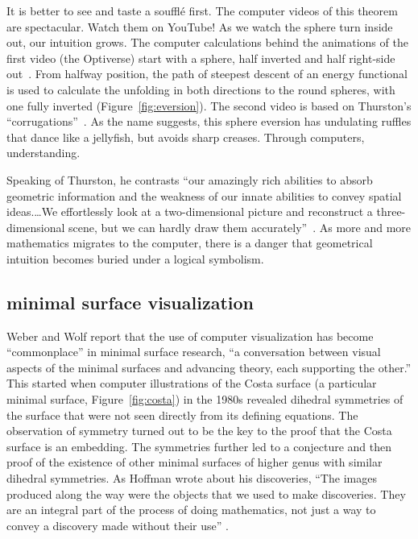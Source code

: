 \documentclass{llncs}
\begin{document}

It is better to see and taste a souffl\'e first.  The computer videos
of this theorem are spectacular.  Watch them on YouTube!  As we watch
the sphere turn inside out, our intuition grows.  The computer
calculations behind the animations of the first video (the Optiverse)
start with a sphere, half inverted and half right-side out~\cite{SFL}.
From halfway position, the path of steepest descent of an energy
functional is used to calculate the unfolding in both directions to
the round spheres, with one fully inverted
(Figure~\ref{fig:eversion}).  The second video is based on Thurston's
``corrugations''~\cite{LMM}. As the name suggests, this sphere
eversion has undulating ruffles that dance like a jellyfish, but
avoids sharp creases.  Through computers, understanding.

Speaking of Thurston, he contrasts ``our amazingly rich abilities to
absorb geometric information and the weakness of our innate abilities
to convey spatial ideas.\ldots We effortlessly look at a
two-dimensional picture and reconstruct a three-dimensional scene, but
we can hardly draw them accurately''~\cite{Pi11}.  As more and more
mathematics migrates to the computer, there is a danger that
geometrical intuition becomes buried under a logical symbolism.

\subsection{minimal surface visualization} %

Weber and Wolf \cite{WW11} report that the use of computer
visualization has become ``commonplace'' in minimal surface research,
``a conversation between visual aspects of the minimal surfaces and
advancing theory, each supporting the other.''  This started when
computer illustrations of the Costa surface (a particular minimal
surface, Figure~\ref{fig:costa}) in the 1980s revealed dihedral
symmetries of the surface that were not seen directly from its
defining equations.  The observation of symmetry turned out to be the
key to the proof that the Costa surface is an embedding.  The
symmetries further led to a conjecture and then proof of the existence
of other minimal surfaces of higher genus with similar dihedral
symmetries.  As Hoffman wrote about his discoveries, ``The images
produced along the way were the objects that we used to make
discoveries. They are an integral part of the process of doing
mathematics, not just a way to convey a discovery made without their
use'' \cite{Hoffman}.
\end{document}
